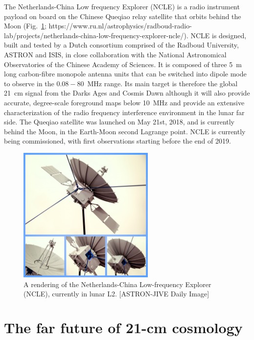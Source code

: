 The Netherlands-China Low frequency Explorer (NCLE) is a radio instrument payload on board on the Chinese Queqiao relay satellite that orbits behind the Moon (Fig.~\ref{fig:fig_NCLE}; https://www.ru.nl/astrophysics/radboud-radio-lab/projects/netherlands-china-low-frequency-explorer-ncle/). NCLE is designed, built and tested by a Dutch consortium comprised of the Radboud University, ASTRON and ISIS, in close collaboration with the National Astronomical Observatories of the Chinese Academy of Sciences. It is composed of three 5~m long carbon-fibre monopole antenna units that can be switched into dipole mode to observe in the $0.08-80$~MHz range. Its main target is therefore the global 21~cm signal from the Darks Ages and Cosmis Dawn although it will also provide accurate, degree-scale foreground maps below 10~MHz and provide an extensive characterization of the radio frequency interference environment in the lunar far side.
%
The Queqiao satellite was launched on May 21st, 2018, and is currently behind the Moon, in the Earth-Moon second Lagrange point. NCLE is currently being commissioned, with first observations starting before the end of 2019.
\begin{figure}[]
\begin{center}
\includegraphics[width=0.6\textwidth]{Koopmans_Bernardi/NCLE_AJDI_edited.jpg}
\end{center}
\caption{A rendering of the Netherlands-China Low-frequency Explorer (NCLE), currently in lunar L2. [ASTRON-JIVE Daily Image]}
\label{fig:fig_NCLE}
\end{figure}


\section{The far future of 21-cm cosmology}

